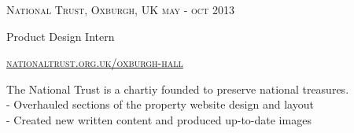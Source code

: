 {
  \textsc{\small{National Trust, Oxburgh, UK
    \hfill
      {\raggedleft
        may - oct 2013
      } \\
    }
  }
  {\raggedright\large {
    Product Design Intern
  } \\}

  \textsc{\small\href{http://www.nationaltrust.org.uk/oxburgh-hall}{nationaltrust.org.uk/oxburgh-hall}}

  \normalsize{
    The National Trust is a chartiy founded to preserve national treasures.\\
    - Overhauled sections of the property website design and layout \\
    - Created new written content and produced up-to-date images
  }
}
